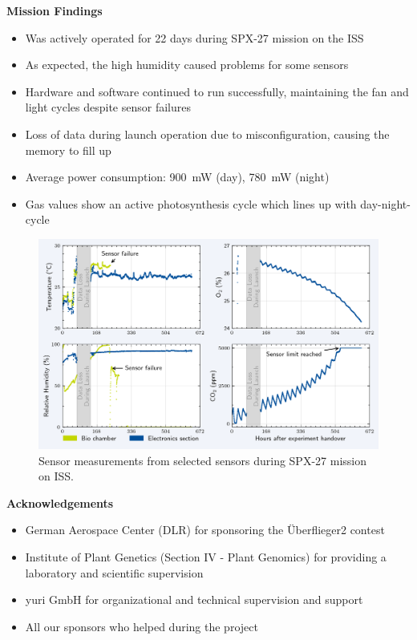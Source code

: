 \documentclass[english,final,20pt,leqno,print]{beamer}
\begin{document}
\begin{frame}[t]
\begin{columns}[T]
\begin{column}{.49\textwidth}
\begin{block}{\strut{}\textbf{Mission Findings}}
  \begin{itemize}
    \item Was actively operated for 22 days during SPX-27 mission on the ISS
    \item As expected, the high humidity caused problems for some sensors
    \item Hardware and software continued to run successfully, maintaining the fan and light cycles despite sensor failures
    \item Loss of data during launch operation due to misconfiguration, causing the memory to fill up
    \item Average power consumption: \qty{900}{mW} (day), \qty{780}{mW} (night) 
    \item Gas values show an active photosynthesis cycle which lines up with day-night-cycle
  \end{itemize}
  
  \begin{figure}
    \includegraphics[width=\textwidth]{img/elgra_plot_2_2.png}
    \caption{Sensor measurements from selected sensors during SPX-27 mission on ISS.}
    \label{fig:sensor_data}
  \end{figure}
\vspace{-1.5em}
  \end{block}

  \begin{block}{\strut{}\textbf{Acknowledgements}}
    \begin{itemize}
        \item German Aerospace Center (DLR) for sponsoring the Überflieger2 contest
        \item Institute of Plant Genetics (Section IV - Plant Genomics) for providing a laboratory and scientific supervision
        \item yuri GmbH for organizational and technical supervision and support
        \item All our sponsors who helped during the project
    \end{itemize}
  \end{block}


\end{column}
\end{columns}
\end{frame}
\end{document}
